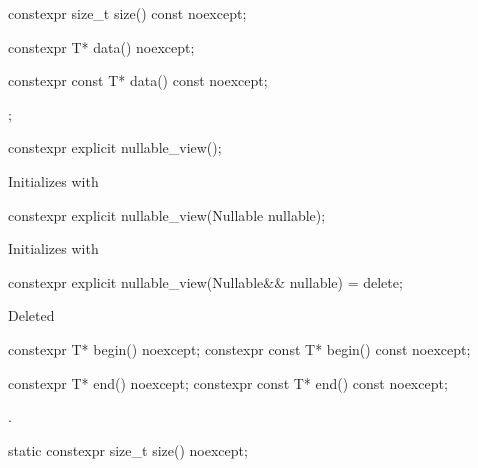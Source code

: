 \documentclass[a4paper,10pt,oneside,openany,final,article]{memoir}
\begin{document}
\begin{wording}
\begin{codeblock}
{    constexpr size_t size() const noexcept;

    constexpr T* data() noexcept;

    constexpr const T* data() const noexcept;
};

\end{codeblock}



%

\pnum
\begin{itemdecl}
  constexpr explicit nullable_view();
\end{itemdecl}
\begin{itemdescr}
  \pnum{}
  \effects{}
  Initializes  with 
\end{itemdescr}

\begin{itemdecl}
  constexpr explicit nullable_view(Nullable nullable);
\end{itemdecl}
\begin{itemdescr}
  \pnum{}
  \effects{}
  Initializes  with 
\end{itemdescr}


\begin{itemdecl}
constexpr explicit nullable_view(Nullable&& nullable) = delete;
\end{itemdecl}
\begin{itemdescr}
  \pnum{}
  Deleted
\end{itemdescr}

\begin{itemdecl}
  constexpr T* begin() noexcept;
  constexpr const T* begin() const noexcept;
\end{itemdecl}

\begin{itemdescr}
  \pnum
  \returns
\end{itemdescr}

\begin{itemdecl}
  constexpr T* end() noexcept;
  constexpr const T* end() const noexcept;
\end{itemdecl}

\begin{itemdescr}
  \pnum{}
  \returns
  .
\end{itemdescr}

\begin{itemdecl}
  static constexpr size_t size() noexcept;
\end{itemdecl}


\end{wording}
\end{document}
